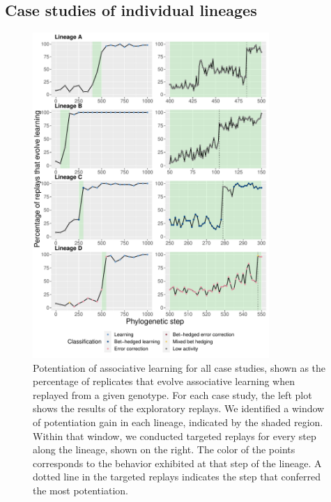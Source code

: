 


\subsection{Case studies of individual lineages}

\begin{figure}[!th]
    \begin{center}
    \includegraphics[width=0.8\textwidth]{03_learning_case_studies/media/combined_replays_R.pdf}
    \vspace*{-3mm}
    \caption{
        Potentiation of associative learning for all case studies, shown as the percentage of replicates that evolve associative learning when replayed from a given genotype. %
        For each case study, the left plot shows the results of the exploratory replays. 
        We identified a window of potentiation gain in each lineage, indicated by the shaded region. 
        Within that window, we conducted targeted replays for every step along the lineage, shown on the right. 
        The color of the points corresponds to the behavior exhibited at that step of the lineage. 
        A dotted line in the targeted replays indicates the step that conferred the most potentiation.
    }
    \label{fig-potentiation-all-case-studies}
    \end{center}
\end{figure}

